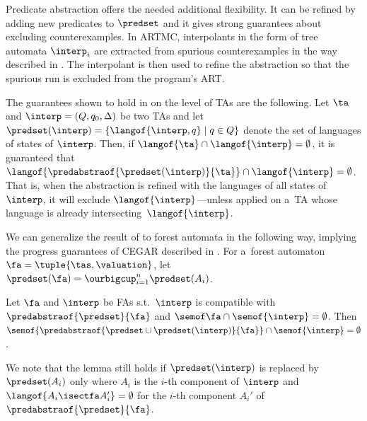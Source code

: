 Predicate abstraction offers the needed additional flexibility.  
It can be refined by adding new predicates to $\predset$ and it gives strong guarantees about excluding counterexamples.
%
In ARTMC, interpolants in the form of tree automata $\interp_i$ are extracted
from spurious counterexamples in the way described in .
%
The interpolant is then used to refine the abstraction so that the spurious run is excluded from the program's ART.

The guarantees shown to hold in \cite{artmc} on the level of TAs are 
the following.  
Let $\ta$ and $\interp = (Q,q_0,\Delta)$ be two TAs and 
let $\predset(\interp) = \{\langof{\interp,q}\mid q\in Q\}$ denote the set of languages of states of $\interp$.
%
Then, if $\langof{\ta} \cap \langof{\interp} = \emptyset$, it is guaranteed that 
$\langof{\predabstraof{\predset(\interp)}{\ta}} \cap \langof{\interp} = \emptyset$.
That is, when the abstraction is refined with the languages of all states of
$\interp$, it will
exclude $\langof{\interp}$---unless applied on a~TA whose language is already
intersecting~$\langof{\interp}$. 


We can generalize the result of \cite{artmc} to forest automata in the
following way,
implying the progress guarantees of CEGAR described in .
For a~forest automaton $\fa = \tuple{\tas,\valuation}$, let $\predset(\fa) =  \ourbigcup_{i=1}^n\predset({A_i})$.
\begin{lemma}
Let $\fa$ and $\interp$ be FAs s.t.~$\interp$ is compatible with $\predabstraof{\predset}{\fa}$ and
$\semof\fa\cap\semof{\interp} = \emptyset$.
Then
$\semof{\predabstraof{\predset\cup\predset(\interp)}{\fa}} \cap \semof{\interp} = \emptyset$.
\end{lemma}
%
We note that the lemma still holds if $\predset(\interp)$ is replaced by
$\predset({A_i})$ only where $A_i$ is the $i$-th component of $\interp$ and $\langof{A_i \isectfa A_i'} = \emptyset$ for the $i$-th component $A_i'$ of $\predabstraof{\predset}{\fa}$. 


